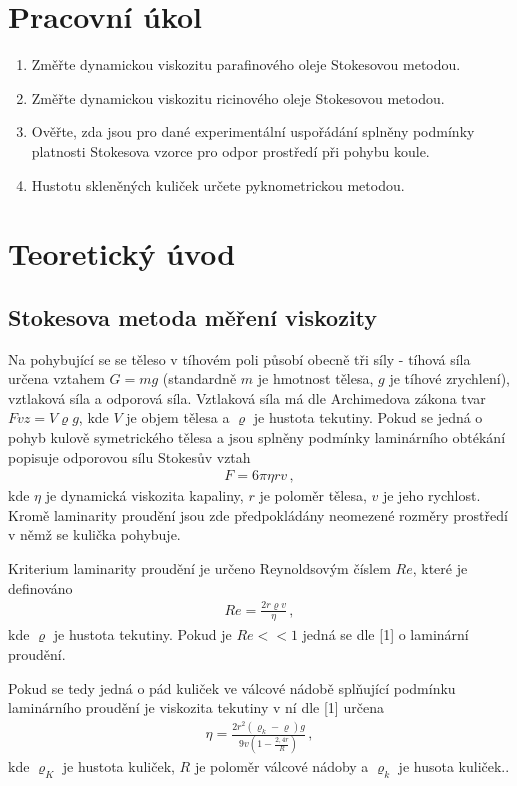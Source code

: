 \documentclass[a4paper,12pt]{article}
\begin{document}


\section{Pracovní úkol}
\begin{enumerate}
\item Změřte dynamickou viskozitu parafinového oleje Stokesovou metodou.
\item Změřte dynamickou viskozitu ricinového oleje Stokesovou metodou.
\item Ověřte, zda jsou pro dané experimentální uspořádání splněny podmínky platnosti Stokesova vzorce pro odpor prostředí při pohybu koule.
\item Hustotu skleněných kuliček určete pyknometrickou metodou. 
\end{enumerate}

\section{Teoretický úvod}

\subsection{Stokesova metoda měření viskozity}
Na pohybující se se těleso v tíhovém poli působí obecně tři síly - tíhová 
síla určena vztahem $G = m g$ (standardně $m$ je hmotnost tělesa, $g$ je tíhové zrychlení),
vztlaková síla a odporová síla. Vztlaková síla má dle Archimedova zákona 
tvar $Fvz = V \varrho g$, kde $V$ je objem tělesa a $\varrho$ je hustota tekutiny.
Pokud se jedná o pohyb kulově symetrického tělesa a jsou splněny podmínky 
laminárního obtékání popisuje odporovou sílu Stokesův vztah
\begin{eqnarray}
F = 6\pi \eta r v \, , \label{stokes}
\end{eqnarray}
kde $\eta$ je dynamická viskozita kapaliny, $r$ je poloměr tělesa, $v$ je 
jeho rychlost. Kromě laminarity proudění jsou zde předpokládány neomezené 
rozměry prostředí v němž se kulička pohybuje.

Kriterium laminarity proudění je určeno Reynoldsovým číslem $Re$, které je 
definováno 
\begin{eqnarray}
Re = \frac{2r\varrho v}{\eta}\, , \label{reynolds}
\end{eqnarray}
kde $\varrho$ je hustota tekutiny. Pokud je $Re << 1$ jedná se dle [1] o  
laminární proudění. 

Pokud se tedy jedná o pád kuliček ve válcové nádobě splňující podmínku 
laminárního proudění je viskozita tekutiny v ní dle [1] určena 
\begin{eqnarray}
\eta = \frac{2r^2(\varrho_k - \varrho)g}{9v\left(1-\frac{2,4r}{R}\right)} \, , \label{viskozita}
\end{eqnarray}
kde $\varrho_K$ je hustota kuliček, $R$ je poloměr válcové nádoby a $\varrho_k$ je husota kuliček..
\end{document}
